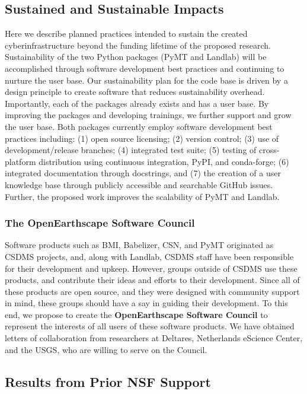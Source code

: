 \subsection{Sustained and Sustainable Impacts}

 Here we describe planned practices intended to sustain the created cyberinfrastructure beyond the funding lifetime of the proposed research.
Sustainability of the two Python packages (PyMT and Landlab) will be accomplished through software development best practices and continuing to nurture the user base. Our sustainability plan for the code base is driven by a design principle to create software that reduces sustainability overhead. Importantly, each of the packages already exists and has a user base. By improving the packages and developing trainings, we further support and grow the user base. Both packages currently employ software development best practices including: (1) open source licensing; (2) version control; (3) use of development/release branches; (4) integrated test suite; (5) testing of cross-platform distribution using continuous integration, PyPI, and conda-forge; (6) integrated documentation through docstrings, and (7) the creation of a user knowledge base through publicly accessible and searchable GitHub issues. Further, the proposed work improves the scalability of PyMT and Landlab.


\subsubsection{The OpenEarthscape Software Council}
\label{sec:software-council}

Software products such as BMI, Babelizer, CSN, and PyMT originated as CSDMS projects, and, along with Landlab, CSDMS staff have been responsible for their development and upkeep.
However, groups outside of CSDMS use these products, and contribute their ideas and efforts to their development.
Since all of these products are open source, and they were designed with community support in mind, these groups should have a say in guiding their development.
To this end, we propose to create the \textbf{OpenEarthscape Software Council} to represent the interests of all users of these software products.
We have obtained letters of collaboration from researchers at Deltares, Netherlands eScience Center, and the USGS, who are willing to serve on the Council.

\subsection*{Results from Prior NSF Support}

